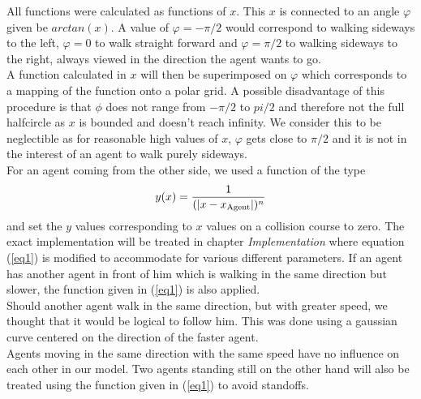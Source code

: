 \noi All functions were calculated as functions of $x$. This $x$ is connected to an angle $\varphi$ given be $arctan(x)$. A value of $\varphi = -\pi/2$ would correspond to walking sideways to the left, $\varphi = 0$ to walk straight forward and $\varphi = \pi/2$ to walking sideways to the right, always viewed in the direction the agent wants to go.\\
A function calculated in $x$ will then be superimposed on $\varphi$ which corresponds to a mapping of the function onto a polar grid. A possible disadvantage of this procedure is that $\phi$ does not range from $-\pi/2$ to $pi/2$ and therefore not the full halfcircle as $x$ is bounded and doesn't reach infinity. We consider this to be neglectible as for reasonable high values of $x$, $\varphi$ gets close to $\pi/2$ and it is not in the interest of an agent to walk purely sideways.\\

\noi For an agent coming from the other side, we used a function of the type
\begin{equation}\label{eq1}
	y(x) = \frac{1}{(|x-x_{\text{Agent}}|)^n}
\end{equation}
\noi and set the $y$ values corresponding to $x$ values on a collision course to zero. The exact implementation will be treated in chapter \textit{Implementation} where equation (\ref{eq1}) is modified to accommodate for various different parameters. If an agent has another agent in front of him which is walking in the same direction but slower, the function given in (\ref{eq1}) is also applied.\\
Should another agent walk in the same direction, but with greater speed, we thought that it would be logical to follow him. This was done using a gaussian curve centered on the direction of the faster agent.\\
Agents moving in the same direction with the same speed have no influence on each other in our model. Two agents standing still on the other hand will also be treated using the function given in (\ref{eq1}) to avoid standoffs.

